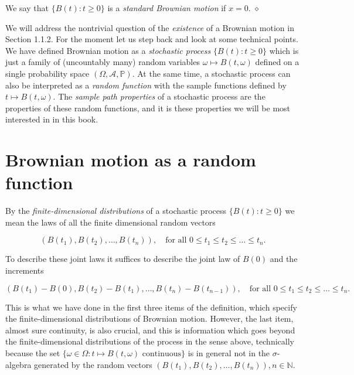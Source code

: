 \documentclass{article}
\begin{document}
We say that $\{B(t) : t \geq 0\}$ is a \textit{standard Brownian motion} if $x = 0$. \hfill $\diamond$

We will address the nontrivial question of the \textit{existence} of a Brownian motion in Section 1.1.2. For the moment let us step back and look at some technical points. We have defined Brownian motion as a \textit{stochastic process} $\{B(t) : t \geq 0\}$ which is just a family of (uncountably many) random variables $\omega \mapsto B(t, \omega)$ defined on a single probability space $(\Omega, \mathcal{A}, \mathbb{P})$. At the same time, a stochastic process can also be interpreted as a \textit{random function} with the sample functions defined by $t \mapsto B(t, \omega)$. The \textit{sample path properties} of a stochastic process are the properties of these random functions, and it is these properties we will be most interested in in this book.




\section*{Brownian motion as a random function}


By the \textit{finite-dimensional distributions} of a stochastic process $\{B(t) : t \geq 0\}$ we mean the laws of all the finite dimensional random vectors

\[
(B(t_1), B(t_2), \ldots, B(t_n)), \quad \text{for all } 0 \leq t_1 \leq t_2 \leq \ldots \leq t_n.
\]

To describe these joint laws it suffices to describe the joint law of $B(0)$ and the increments

\[
(B(t_1) - B(0), B(t_2) - B(t_1), \ldots, B(t_n) - B(t_{n-1})), \quad \text{for all } 0 \leq t_1 \leq t_2 \leq \ldots \leq t_n.
\]

This is what we have done in the first three items of the definition, which specify the finite-dimensional distributions of Brownian motion. However, the last item, almost sure continuity, is also crucial, and this is information which goes beyond the finite-dimensional distributions of the process in the sense above, technically because the set $\{\omega \in \Omega : t \mapsto B(t, \omega) \text{ continuous}\}$ is in general not in the $\sigma$-algebra generated by the random vectors $(B(t_1), B(t_2), \ldots, B(t_n)), n \in \mathbb{N}$.
\end{document}
